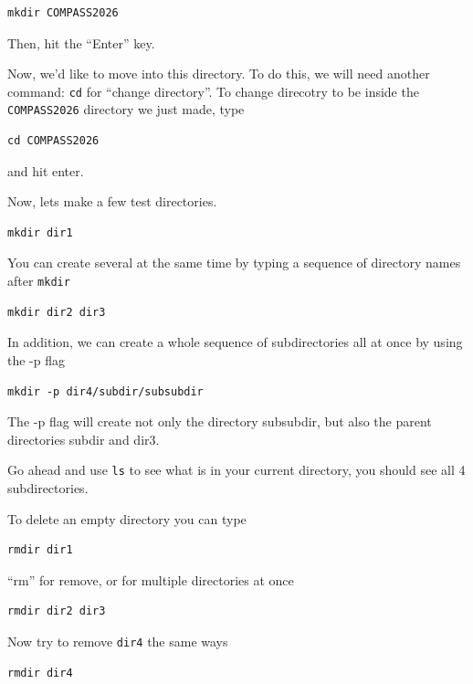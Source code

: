 \documentclass[aps,showpacs,prd,notitlepage,preprintnumbers,amsmath,amssymb,letterpaper]{revtex4}
\begin{document}
\begin{verbatim}
mkdir COMPASS2026
\end{verbatim}

Then, hit the ``Enter'' key.

Now, we'd like to move into this directory. To do this, we will need another command: \verb|cd| for ``change directory''.
To change direcotry to be inside the \verb|COMPASS2026| directory we just made, type

\begin{verbatim}
cd COMPASS2026
\end{verbatim}

and hit enter.

Now, lets make a few test directories.

\begin{verbatim}
mkdir dir1
\end{verbatim}

You can create several at the same time by typing a sequence of directory names after \verb|mkdir|

\begin{verbatim}
mkdir dir2 dir3
\end{verbatim}

In addition, we can create a whole sequence of subdirectories all at once by using the -p flag

\begin{verbatim}
mkdir -p dir4/subdir/subsubdir
\end{verbatim}

The -p flag will create not only the directory subsubdir, but also the parent directories subdir and dir3.

Go ahead and use \verb|ls| to see what is in your current directory, you should see all 4 subdirectories.

To delete an empty directory you can type

\begin{verbatim}
rmdir dir1
\end{verbatim}

``rm'' for remove, or for multiple directories at once

\begin{verbatim}
rmdir dir2 dir3
\end{verbatim}

Now try to remove \verb|dir4| the same ways

\begin{verbatim}
rmdir dir4
\end{verbatim}
\end{document}
